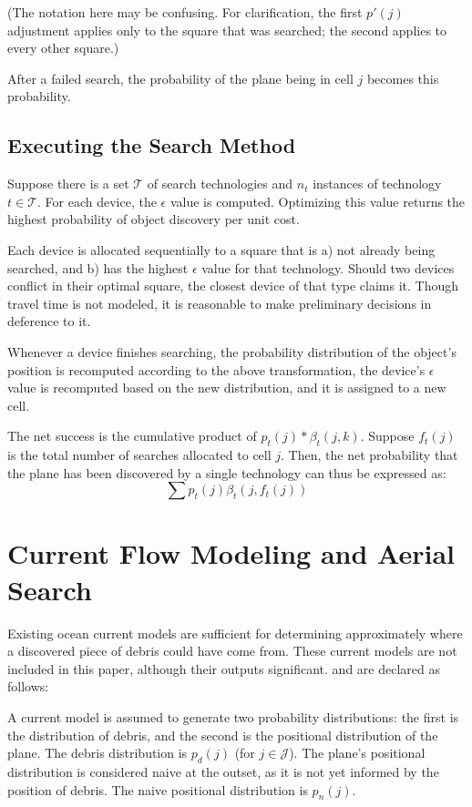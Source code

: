 \documentclass[a4paper]{article}
\begin{document}
(The notation here may be confusing. For clarification, the first $p'(j)$ adjustment applies only to the square that was searched; the second applies to every other square.)

After a failed search, the probability of the plane being in cell $j$ becomes this probability.

\subsection{Executing the Search Method}

Suppose there is a set $\mathcal{T}$ of search technologies and $n_t$ instances of technology $t\in\mathcal{T}$. For each device, the $\epsilon$ value is computed. Optimizing this value returns the highest probability of object discovery per unit cost.

Each device is allocated sequentially to a square that is a) not already being searched, and b) has the highest $\epsilon$ value for that technology. Should two devices conflict in their optimal square, the closest device of that type claims it. Though travel time is not modeled, it is reasonable to make preliminary decisions in deference to it.

Whenever a device finishes searching, the probability distribution of the object's position is recomputed according to the above transformation, the device's $\epsilon$ value is recomputed based on the new distribution, and it is assigned to a new cell.

The net success is the cumulative product of $p_t(j)*\beta_t(j,k)$. Suppose $f_t(j)$ is the total number of searches allocated to cell $j$. Then, the net probability that the plane has been discovered by a single technology can thus be expressed as: $$\sum p_t(j)\beta_t(j,f_t(j))$$



\section{Current Flow Modeling and Aerial Search}

Existing ocean current models are sufficient for determining approximately where a discovered piece of debris could have come from. These current models are not included in this paper, although their outputs significant. and are declared as follows:

A current model is assumed to generate two probability distributions: the first is the distribution of debris, and the second is the positional distribution of the plane. The debris distribution is $p_d(j)$ (for $j\in\mathcal{J}$). The plane's positional distribution is considered naive at the outset, as it is not yet informed by the position of debris. The naive positional distribution is $p_n(j)$. 
\end{document}
